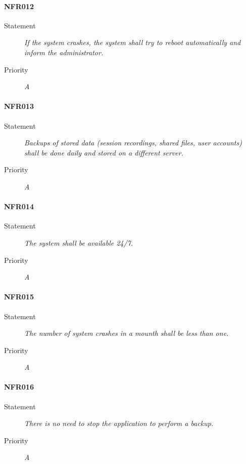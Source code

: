 \paragraph{NFR012}
\begin{description}
\item [Statement] \textit{If the system crashes, the system shall try to reboot
    automatically and inform the administrator.}
\item [Priority] \textit{A}
\end{description}

\paragraph{NFR013}
\begin{description}
\item [Statement] \textit{Backups of stored data (session recordings, shared
    files, user accounts) shall be done daily and stored on a different
    server.}
\item [Priority] \textit{A}
\end{description}

\paragraph{NFR014}
\begin{description}
\item [Statement] \textit{The system shall be available 24/7.}
\item [Priority] \textit{A}
\end{description}

\paragraph{NFR015}
\begin{description}
\item [Statement] \textit{The number of system crashes in a mounth shall
    be less than one.}
\item [Priority] \textit{A}
\end{description}

\paragraph{NFR016}
\begin{description}
\item [Statement] \textit{There is no need to stop the application to perform
    a backup.}
\item [Priority] \textit{A}
\end{description}